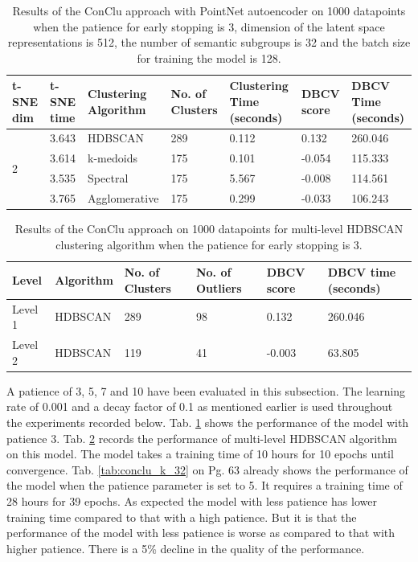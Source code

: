 \begin{table}[H]
  \setlength\extrarowheight{10pt}
  \caption{Results of the ConClu approach with PointNet autoencoder on 1000 datapoints when the patience for early stopping is 3, dimension of the latent space representations is 512, the number of semantic subgroups is 32 and the batch size for training the model is 128. }
  \centering
  \begin{tabular}{|p{30pt}|p{50pt}|p{60pt}|p{50pt}|p{50pt}|p{50pt}|p{40pt}|}
    \toprule
    \ac{t-SNE} dim	& \ac{t-SNE} time & Clustering Algorithm & No. of Clusters & Clustering Time (seconds) & \ac{DBCV} score & \ac{DBCV} Time (seconds)\\
    \midrule
    \multirow{4}{30pt}{2}	& 3.643 & \ac{HDBSCAN}	& 289	& 0.112 & 0.132	& 260.046 \\ \cline{2-7} 
    & 3.614 & k-medoids	& 175	& 0.101	& -0.054	& 115.333 \\ \cline{2-7} 
    & 3.535 & Spectral	& 175	& 5.567	& -0.008	& 114.561 \\ \cline{2-7}
    & 3.765 & Agglomerative	& 175	& 0.299	& -0.033	& 106.243 \\ 
    \bottomrule
  \end{tabular}
  \label{tab:conclu_patience_3}
\end{table}

\begin{table}[H]
  \setlength\extrarowheight{10pt}
  \caption{Results of the ConClu approach on 1000 datapoints for multi-level \ac{HDBSCAN} clustering algorithm when the patience for early stopping is 3. }
  \centering
  \begin{tabular}{|l|l|l|l|l|l|}
    \toprule
    Level & Algorithm	& No. of Clusters	& No. of Outliers	& DBCV score	& \ac{DBCV} time (seconds)	\\  
    \midrule
    Level 1 & \ac{HDBSCAN} & 289	& 98	& 0.132	& 260.046 \\ \cline{1-6}
    Level 2 & \ac{HDBSCAN} & 119	& 41	& -0.003	& 63.805 \\ 
    \bottomrule
  \end{tabular}
  \label{tab:conclu_patience_3_levels}
\end{table}
A patience of 3, 5, 7 and 10 have been evaluated in this subsection. The learning rate of 0.001 and a decay factor of 0.1 as mentioned earlier is used throughout the experiments recorded below. Tab. \ref{tab:conclu_patience_3} shows the performance of the model with patience 3. Tab. \ref{tab:conclu_patience_3_levels} records the performance of multi-level \ac{HDBSCAN} algorithm on this model. The model takes a training time of 10 hours for 10 epochs until convergence. Tab. \ref{tab:conclu_k_32} on Pg. 63 already shows the performance of the model when the patience parameter is set to 5. It requires a training time of 28 hours for 39 epochs. As expected the model with less patience has lower training time compared to that with a high patience. But it is that the performance of the model with less patience is worse as compared to that with higher patience. There is a 5\% decline in the quality of the performance. 

